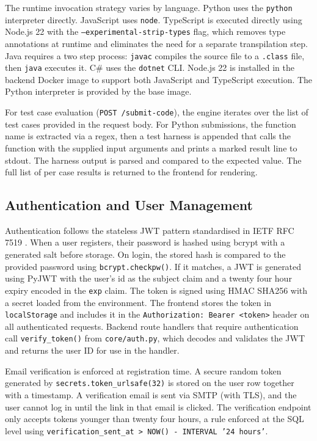 The runtime invocation strategy varies by language. Python uses the
\texttt{python} interpreter directly. JavaScript uses \texttt{node}.
TypeScript is executed directly using Node.js 22 with the
\texttt{--experimental-strip-types} flag, which removes type annotations
at runtime and eliminates the need for a separate transpilation step.
Java requires a two step process: \texttt{javac} compiles the source file
to a \texttt{.class} file, then \texttt{java} executes it. C\# uses the
\texttt{dotnet} CLI. Node.js 22 is installed in the backend Docker image
to support both JavaScript and TypeScript execution. The Python
interpreter is provided by the base image.

For test case evaluation (\texttt{POST /submit-code}), the engine
iterates over the list of test cases provided in the request body. For
Python submissions, the function name is extracted via a regex, then a
test harness is appended that calls the function with the supplied
input arguments and prints a marked result line to stdout. The harness
output is parsed and compared to the expected value. The full list of
per case results is returned to the frontend for rendering.

\subsection{Authentication and User Management}

Authentication follows the stateless JWT pattern standardised in IETF
RFC 7519 \cite{jwt2015}. When a user registers, their password is
hashed using bcrypt \cite{provos1999bcrypt} with a generated salt
before storage. On login, the stored hash is compared to the provided
password using \texttt{bcrypt.checkpw()}. If it matches, a JWT is
generated using PyJWT with the user's id as the subject claim and a
twenty four hour expiry encoded in the \texttt{exp} claim. The token
is signed using HMAC SHA256 with a secret loaded from the environment.
The frontend stores the token in \texttt{localStorage} and includes it
in the \texttt{Authorization: Bearer <token>} header on all
authenticated requests. Backend route handlers that require
authentication call \texttt{verify\_token()} from \texttt{core/auth.py},
which decodes and validates the JWT and returns the user ID for use
in the handler.

Email verification is enforced at registration time. A secure random
token generated by \texttt{secrets.token\_urlsafe(32)} is stored on the
user row together with a timestamp. A verification email is sent via
SMTP (with TLS), and the user cannot log in until the link in that
email is clicked. The verification endpoint only accepts tokens younger
than twenty four hours, a rule enforced at the SQL level using
\texttt{verification\_sent\_at > NOW() - INTERVAL '24 hours'}.


